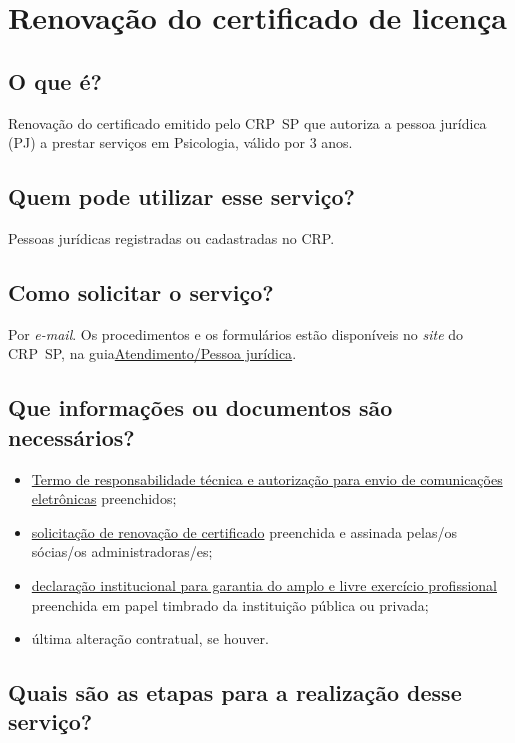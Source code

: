 \chapter{Renovação do certificado de licença}
\label{chap:pj-licenca}

\section{O que é?}

Renovação do certificado emitido pelo CRP~SP que autoriza a pessoa jurídica (PJ) a prestar serviços em Psicologia, válido por 3 anos.

\section{Quem pode utilizar esse serviço?}

Pessoas jurídicas registradas ou cadastradas no CRP.

\section{Como solicitar o serviço?}

Por \emph{e-mail}. Os procedimentos e os formulários estão disponíveis no \emph{site} do CRP~SP, na guia\href{https://www.crpsp.org/pagina/view/30}{Atendimento/Pessoa jurídica}.

\section{Que informações ou documentos são necessários?}

\begin{itemize}
  \item  \hyperref[]{Termo  de responsabilidade técnica e autorização para envio de comunicações  eletrônicas} preenchidos;
  \item  \hyperref[]{solicitação  de renovação de certificado} preenchida e assinada pelas/os sócias/os  administradoras/es;
  \item  \hyperref[]{declaração  institucional para garantia do amplo e livre exercício profissional}  preenchida em papel timbrado da instituição pública ou privada;
  \item  última alteração contratual, se houver.
\end{itemize}

\section{Quais são as etapas para a realização desse serviço?}

